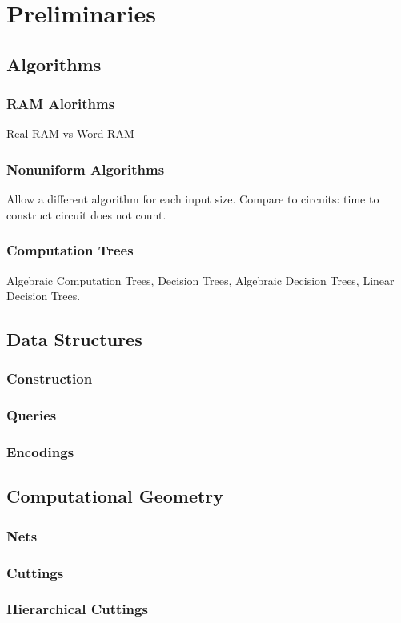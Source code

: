\part{Preliminaries}

\chapter{Algorithms}

\section{RAM Alorithms}

Real-RAM vs Word-RAM

\section{Nonuniform Algorithms}

Allow a different algorithm for each input size.
Compare to circuits: time to construct circuit does not count.

\section{Computation Trees}

Algebraic Computation Trees,
Decision Trees,
Algebraic Decision Trees,
Linear Decision Trees.


\chapter{Data Structures}

\section{Construction}

\section{Queries}

\section{Encodings}


\chapter{Computational Geometry}

\section{Nets}

\section{Cuttings}

\section{Hierarchical Cuttings}
